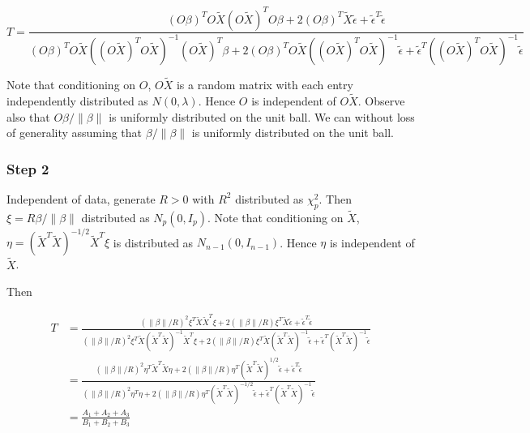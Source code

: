 \documentclass[review]{elsarticle}
\theoremstyle{plain}
\theoremstyle{definition}
\theoremstyle{remark}
\begin{document}
\begin{equation}
    T=\frac{{(O\beta)}^T O\tilde{X}{(O\tilde{X})}^T O\beta+
        2{(O\beta)}^T \tilde{X}\tilde{\epsilon}+
        \tilde{\epsilon}^T\tilde{\epsilon}
    }{{(O\beta)}^T O\tilde{X}{({(O\tilde{X})}^T O\tilde{X})}^{-1}{(O\tilde{X})}^T \beta+
        2{(O\beta)}^T O\tilde{X}{({(O\tilde{X})}^T O\tilde{X})}^{-1}\tilde{\epsilon}+
        \tilde{\epsilon}^T{({(O\tilde{X})}^T O\tilde{X})}^{-1}\tilde{\epsilon}
    }
\end{equation}

Note that conditioning on $O$, $O\tilde{X}$ is a random matrix with each entry independently distributed as $N(0,\lambda)$. Hence $O$ is independent of $O\tilde{X}$. Observe also that $O\beta/\|\beta\|$ is uniformly distributed on the unit ball.  We can without loss of generality assuming that $\beta/\|\beta\|$ is uniformly distributed on the unit ball.

\subsubsection{Step 2}
Independent of data, generate $R>0$ with $R^2$ distributed as $\chi^2_{p}$. Then $\xi=R\beta/\|\beta\|$ distributed as $N_p(0,I_p)$.
Note that conditioning on $\tilde{X}$, $\eta={(\tilde{X}^T\tilde{X})}^{-1/2}\tilde{X}^T \xi$ is distributed as $N_{n-1}(0,I_{n-1})$. Hence $\eta$ is independent of $\tilde{X}$.

Then

\begin{equation}
    \begin{aligned}
        T&=\frac{{(\|\beta\|/R)}^2\xi^T \tilde{X}\tilde{X}^T \xi+
        2(\|\beta\|/R)\xi^T \tilde{X}\tilde{\epsilon}+
        \tilde{\epsilon}^T\tilde{\epsilon}
    }{{(\|\beta\|/R)}^2\xi^T \tilde{X}{(\tilde{X}^T\tilde{X})}^{-1}\tilde{X}^T \xi+
        2(\|\beta\|/R)\xi^T \tilde{X}{(\tilde{X}^T\tilde{X})}^{-1}\tilde{\epsilon}+
        \tilde{\epsilon}^T{(\tilde{X}^T\tilde{X})}^{-1}\tilde{\epsilon}
    }\\
        &=
        \frac{{(\|\beta\|/R)}^2\eta^T \tilde{X}^T\tilde{X} \eta+
        2(\|\beta\|/R)\eta^T {(\tilde{X}^T\tilde{X})}^{1/2}\tilde{\epsilon}+
        \tilde{\epsilon}^T\tilde{\epsilon}
    }{{(\|\beta\|/R)}^2\eta^T\eta+
        2(\|\beta\|/R)\eta^T{(\tilde{X}^T\tilde{X})}^{-1/2}\tilde{\epsilon}+
        \tilde{\epsilon}^T{(\tilde{X}^T\tilde{X})}^{-1}\tilde{\epsilon}
    }\\
        &=\frac{A_1+A_2+A_3}{B_1+B_2+B_3}
    \end{aligned}
\end{equation}
\end{document}
